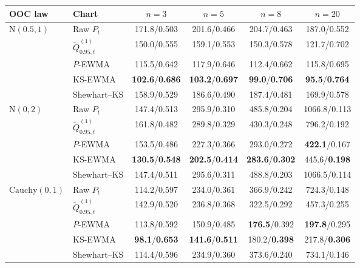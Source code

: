 \begin{tabular}{@{}llcccc@{}}
\toprule
OOC law & Chart & $n=3$ & $n=5$ & $n=8$ & $n=20$ \\
\midrule
$\mathrm N(0.5,1)$ & Raw $P_t$ & 171.8/0.503 & 201.6/0.466 & 204.7/0.463 & 187.0/0.552 \\
 & $\widetilde Q_{0.95,t}^{(1)}$ & 150.0/0.555 & 159.1/0.553 & 150.3/0.578 & 121.7/0.702 \\
 & $P$-EWMA & 115.5/0.642 & 117.9/0.646 & 112.4/0.662 & 115.8/0.695 \\
 & KS-EWMA & \textbf{102.6}/\textbf{0.686} & \textbf{103.2}/\textbf{0.697} & \textbf{99.0}/\textbf{0.706} & \textbf{95.5}/\textbf{0.764} \\
 & Shewhart--KS & 158.9/0.529 & 186.6/0.490 & 187.4/0.481 & 169.9/0.578 \\
\addlinespace[2pt]
$\mathrm N(0,2)$ & Raw $P_t$ & 147.4/0.513 & 295.9/0.310 & 485.8/0.204 & 1066.8/0.113 \\
 & $\widetilde Q_{0.95,t}^{(1)}$ & 161.8/0.482 & 289.8/0.329 & 430.3/0.248 & 796.2/0.192 \\
 & $P$-EWMA & 153.5/0.486 & 227.3/0.366 & 293.0/0.272 & \textbf{422.1}/0.167 \\
 & KS-EWMA & \textbf{130.5}/\textbf{0.548} & \textbf{202.5}/\textbf{0.414} & \textbf{283.6}/\textbf{0.302} & 445.6/\textbf{0.198} \\
 & Shewhart--KS & 147.4/0.511 & 295.6/0.311 & 488.8/0.203 & 1066.5/0.114 \\
\addlinespace[2pt]
$\mathrm{Cauchy}(0,1)$ & Raw $P_t$ & 114.2/0.597 & 234.0/0.361 & 366.9/0.242 & 724.3/0.148 \\
 & $\widetilde Q_{0.95,t}^{(1)}$ & 142.9/0.520 & 236.8/0.368 & 322.5/0.292 & 457.3/0.255 \\
 & $P$-EWMA & 113.8/0.592 & 150.9/0.485 & \textbf{176.5}/0.392 & \textbf{197.8}/0.295 \\
 & KS-EWMA & \textbf{98.1}/\textbf{0.653} & \textbf{141.6}/\textbf{0.511} & 180.2/\textbf{0.398} & 217.8/\textbf{0.306} \\
 & Shewhart--KS & 114.4/0.596 & 234.9/0.360 & 373.6/0.240 & 734.1/0.146 \\
\bottomrule
\end{tabular}
